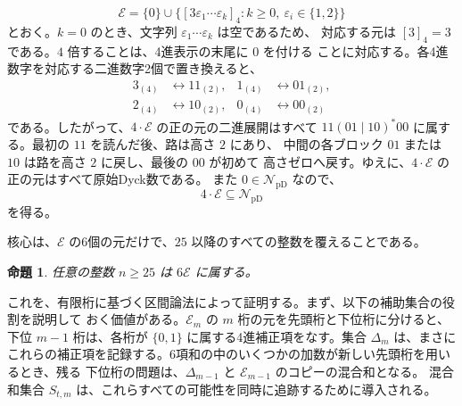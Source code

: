 \documentclass[12pt]{ltjsarticle}
\theoremstyle{plain}
\newtheorem{proposition}[theorem]{命題}
\newcommand{\val}[2]{[#1]_{#2}}
\newcommand{\NpD}{\mathcal{N}_{\mathrm{pD}}}
\begin{document}
\[
 \mathcal E=\{0\}\cup
 \bigl\{\val{3\varepsilon_1\cdots\varepsilon_k}{4}:
        k\geq0,\ \varepsilon_i\in\{1,2\}\bigr\}
\]
とおく。$k=0$ のとき、文字列 $\varepsilon_1\cdots\varepsilon_k$ は空であるため、
対応する元は $\val{3}{4}=3$ である。$4$ 倍することは、4進表示の末尾に $0$ を付ける
ことに対応する。各4進数字を対応する二進数字2個で置き換えると、
\[
\begin{aligned}
 3_{(4)}&\longleftrightarrow11_{(2)},&
 1_{(4)}&\longleftrightarrow01_{(2)},\\
 2_{(4)}&\longleftrightarrow10_{(2)},&
 0_{(4)}&\longleftrightarrow00_{(2)}
\end{aligned}
\]
である。したがって、$4\cdot\mathcal E$ の正の元の二進展開はすべて
$11(01\mid10)^*00$ に属する。最初の $11$ を読んだ後、路は高さ $2$ にあり、
中間の各ブロック $01$ または $10$ は路を高さ $2$ に戻し、最後の $00$ が初めて
高さゼロへ戻す。ゆえに、$4\cdot\mathcal E$ の正の元はすべて原始Dyck数である。
また $0\in\NpD$ なので、
\begin{equation}\label{eq:4E}
        4\cdot\mathcal E\subseteq\NpD
\end{equation}
を得る。

核心は、$\mathcal E$ の6個の元だけで、$25$ 以降のすべての整数を覆えることである。

\begin{proposition}\label{prop:E}
任意の整数 $n\geq25$ は $6\mathcal E$ に属する。
\end{proposition}

これを、有限桁に基づく区間論法によって証明する。まず、以下の補助集合の役割を説明して
おく価値がある。$\mathcal E_m$ の $m$ 桁の元を先頭桁と下位桁に分けると、下位
$m-1$ 桁は、各桁が $\{0,1\}$ に属する4進補正項をなす。集合 $\Delta_m$ は、まさに
これらの補正項を記録する。6項和の中のいくつかの加数が新しい先頭桁を用いるとき、残る
下位桁の問題は、$\Delta_{m-1}$ と $\mathcal E_{m-1}$ のコピーの混合和となる。
混合和集合 $S_{t,m}$ は、これらすべての可能性を同時に追跡するために導入される。
\end{document}
